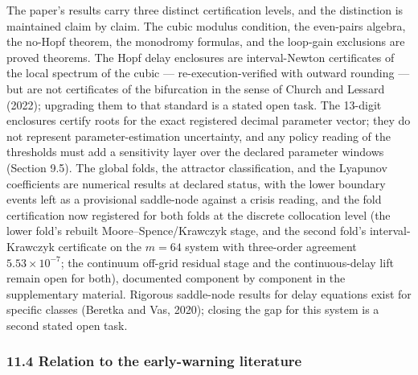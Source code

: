 \documentclass[11pt]{article}
\begin{document}
The paper's results carry three distinct certification levels, and the
distinction is maintained claim by claim. The cubic modulus condition,
the even-pairs algebra, the no-Hopf theorem, the monodromy formulas, and
the loop-gain exclusions are proved theorems. The Hopf delay enclosures
are interval-Newton certificates of the local spectrum of the cubic ---
re-execution-verified with outward rounding --- but are not certificates
of the bifurcation in the sense of Church and Lessard (2022); upgrading
them to that standard is a stated open task. The 13-digit enclosures
certify roots for the exact registered decimal parameter vector; they do
not represent parameter-estimation uncertainty, and any policy reading
of the thresholds must add a sensitivity layer over the declared
parameter windows (Section 9.5). The global folds, the attractor
classification, and the Lyapunov coefficients are numerical results at
declared status, with the lower boundary events left as a provisional
saddle-node against a crisis reading, and the fold certification now
registered for both folds at the discrete collocation level (the lower
fold's rebuilt Moore--Spence/Krawczyk stage, and the second fold's
interval-Krawczyk certificate on the \(m = 64\) system with three-order
agreement \(5.53\times10^{-7}\); the continuum off-grid residual stage
and the continuous-delay lift remain open for both), documented
component by component in the supplementary material. Rigorous
saddle-node results for delay equations exist for specific classes
(Beretka and Vas, 2020); closing the gap for this system is a second
stated open task.

\subsubsection{11.4 Relation to the early-warning
literature}\label{relation-to-the-early-warning-literature}
\end{document}

